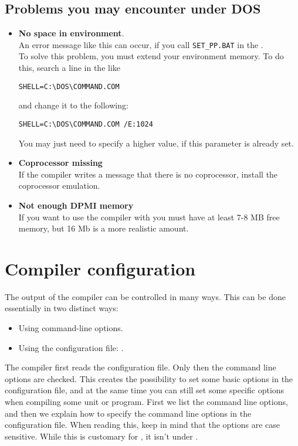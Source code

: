 \documentclass{book}
\begin{document}
\section{Problems you may encounter under DOS}
\begin{itemize}
\item \textbf{No space in environment}.\\
An error message like this can occur, if you call
\verb|SET_PP.BAT| in the .\\
To solve this problem, you must extend your environment memory.
To do this, search a line in the  like
\begin{verbatim}
SHELL=C:\DOS\COMMAND.COM
\end{verbatim}
and change it to the following:
\begin{verbatim}
SHELL=C:\DOS\COMMAND.COM /E:1024
\end{verbatim}
You may just need to specify a higher value, if this parameter is already set.
\item \textbf{ Coprocessor missing}\\
If the compiler writes
a message that there is no coprocessor, install
the coprocessor emulation.
\item \textbf{Not enough DPMI memory}\\
If you want to use the compiler with  you must have at least
7-8 MB free  memory, but 16 Mb is a more realistic amount.
\end{itemize}



\chapter{Compiler configuration}
\label{ch:CompilerConfiguration}

The output of the compiler can be controlled in many ways. This can be done
essentially in two distinct ways:
\begin{itemize}
\item Using command-line options.
\item Using the configuration file: .
\end{itemize}
The compiler first reads the configuration file. Only then the command line
options are checked. This creates the possibility to set some basic options
in the configuration file, and at the same time you can still set some
specific options when compiling some unit or program. First we list the
command line options, and then we explain how to specify the command
line options in the configuration file. When reading this, keep in mind
that the options are case sensitive. While this is customary for \linux, it
isn't under \dos.
\end{document}
